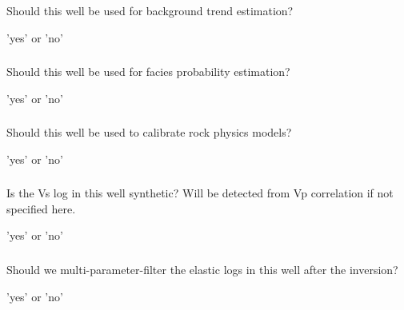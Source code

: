 \subsubsection{}
 \slist
   \item \Description Should this well be used for background trend estimation?
   \item \Argument 'yes' or 'no'
   \item \Default
 \elist

\subsubsection{}
 \slist
   \item \Description Should this well be used for facies probability estimation?
   \item \Argument 'yes' or 'no'
   \item \Default
 \elist

\subsubsection{}
 \slist
   \item \Description Should this well be used to calibrate rock physics models?
   \item \Argument 'yes' or 'no'
   \item \Default
 \elist

\subsubsection{}
 \slist
   \item \Description Is the Vs log in this well synthetic? Will be detected from Vp correlation if not specified here.
   \item \Argument 'yes' or 'no'
   \item \Default
 \elist

\subsubsection{}
 \slist
   \item \Description Should we multi-parameter-filter the elastic
                      logs in this well after the inversion?
   \item \Argument 'yes' or 'no'
   \item \Default
 \elist

